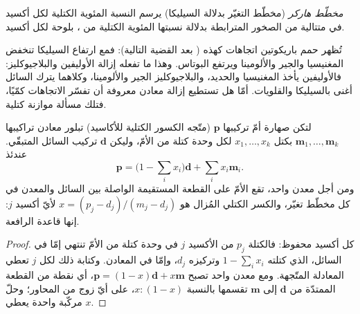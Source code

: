 \begin{definition}\label{def:b2:magmatic-differentiation:harker}
\emph{مخطّط هاركر} (مخطّط التغيّر بدلالة السيليكا) يرسم
النسبة المئوية الكتلية لكل أكسيد في متتالية من الصخور المترابطة بدلالة نسبتها
المئوية الكتلية من ، بلوحة لكل أكسيد.
\end{definition}


تُظهر حمم باريكوتين اتجاهات كهذه ( بعد القضية
التالية): فمع ارتفاع السيليكا تنخفض المغنيسيا والجير والألومينا ويرتفع البوتاس. وهذا
ما تفعله إزالة الأوليفين والبلاجيوكليز:
فالأوليفين يأخذ المغنيسيا والحديد، والبلاجيوكليز الجير والألومينا، وكلاهما يترك
السائل أغنى بالسيليكا والقلويات. أمّا هل تستطيع إزالة معادن معروفة أن
تفسّر الاتجاهات كمّيًا، فتلك مسألة موازنة كتلية.

\begin{proposition}\label{prop:b2:magmatic-differentiation:lever}
لتكن صهارة أمّ تركيبها $\mathbf p$ (متّجه الكسور الكتلية للأكاسيد)
تبلور معادن تراكيبها $\mathbf m_1, \dots, \mathbf m_k$ بكتل
$x_1, \dots, x_k$ لكل وحدة كتلة من الأمّ، وليكن $\mathbf d$ تركيب
السائل المتبقّي. عندئذ
\[
\mathbf p = \Big(1 - \sum_i x_i\Big)\mathbf d + \sum_i x_i \mathbf m_i .
\]
ومن أجل معدن واحد، تقع الأمّ على القطعة المستقيمة الواصلة بين السائل
والمعدن في كل مخطّط تغيّر، والكسر الكتلي المُزال هو
$x = (p_j - d_j)/(m_j - d_j)$ لأيّ أكسيد $j$: إنها قاعدة الرافعة.
\end{proposition}

\begin{proof}
كل أكسيد محفوظ: فالكتلة $p_j$ من الأكسيد $j$ في وحدة كتلة من الأمّ تنتهي
إمّا في السائل، الذي كتلته $1 - \sum_i x_i$ وتركيزه $d_j$، وإمّا في
المعادن. وكتابة ذلك لكل $j$ تعطي المعادلة المتّجهة. ومع معدن واحد
تصبح $\mathbf p = (1-x)\mathbf d + x\mathbf m$، أي نقطة من القطعة الممتدّة من
$\mathbf d$ إلى $\mathbf m$ تقسمها بالنسبة $x : (1-x)$، على أيّ زوج من
المحاور؛ وحلّ مركّبة واحدة يعطي $x$.
\end{proof}

